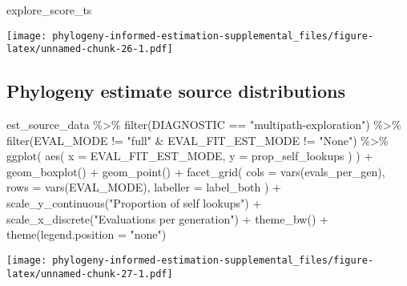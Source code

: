 \documentclass[
]{book}
\newenvironment{Shaded}{\begin{snugshade}}{\end{snugshade}}
\newcommand{\AttributeTok}[1]{\textcolor[rgb]{0.77,0.63,0.00}{#1}}
\newcommand{\FunctionTok}[1]{\textcolor[rgb]{0.00,0.00,0.00}{#1}}
\newcommand{\NormalTok}[1]{#1}
\newcommand{\SpecialCharTok}[1]{\textcolor[rgb]{0.00,0.00,0.00}{#1}}
\newcommand{\StringTok}[1]{\textcolor[rgb]{0.31,0.60,0.02}{#1}}
\begin{document}
\begin{Shaded}
\begin{Highlighting}[]
\NormalTok{explore\_score\_ts}
\end{Highlighting}
\end{Shaded}

\texttt{[image: phylogeny-informed-estimation-supplemental\_files/figure-latex/unnamed-chunk-26-1.pdf]}

\hypertarget{phylogeny-estimate-source-distributions-1}{%
\subsection{Phylogeny estimate source distributions}\label{phylogeny-estimate-source-distributions-1}}

\begin{Shaded}
\begin{Highlighting}[]
\NormalTok{est\_source\_data }\SpecialCharTok{\%\textgreater{}\%}
  \FunctionTok{filter}\NormalTok{(DIAGNOSTIC }\SpecialCharTok{==} \StringTok{"multipath{-}exploration"}\NormalTok{) }\SpecialCharTok{\%\textgreater{}\%}
  \FunctionTok{filter}\NormalTok{(EVAL\_MODE }\SpecialCharTok{!=} \StringTok{"full"} \SpecialCharTok{\&}\NormalTok{ EVAL\_FIT\_EST\_MODE }\SpecialCharTok{!=} \StringTok{"None"}\NormalTok{) }\SpecialCharTok{\%\textgreater{}\%}
  \FunctionTok{ggplot}\NormalTok{(}
      \FunctionTok{aes}\NormalTok{(}
        \AttributeTok{x =}\NormalTok{ EVAL\_FIT\_EST\_MODE,}
        \AttributeTok{y =}\NormalTok{ prop\_self\_lookups}
\NormalTok{      )}
\NormalTok{    ) }\SpecialCharTok{+}
    \FunctionTok{geom\_boxplot}\NormalTok{() }\SpecialCharTok{+}
    \FunctionTok{geom\_point}\NormalTok{() }\SpecialCharTok{+}
    \FunctionTok{facet\_grid}\NormalTok{(}
      \AttributeTok{cols =} \FunctionTok{vars}\NormalTok{(evals\_per\_gen),}
      \AttributeTok{rows =} \FunctionTok{vars}\NormalTok{(EVAL\_MODE),}
      \AttributeTok{labeller =}\NormalTok{ label\_both}
\NormalTok{    ) }\SpecialCharTok{+}
    \FunctionTok{scale\_y\_continuous}\NormalTok{(}\StringTok{"Proportion of self lookups"}\NormalTok{) }\SpecialCharTok{+}
    \FunctionTok{scale\_x\_discrete}\NormalTok{(}\StringTok{"Evaluations per generation"}\NormalTok{) }\SpecialCharTok{+}
    \FunctionTok{theme\_bw}\NormalTok{() }\SpecialCharTok{+}
    \FunctionTok{theme}\NormalTok{(}\AttributeTok{legend.position =} \StringTok{"none"}\NormalTok{)}
\end{Highlighting}
\end{Shaded}

\texttt{[image: phylogeny-informed-estimation-supplemental\_files/figure-latex/unnamed-chunk-27-1.pdf]}
\end{document}
